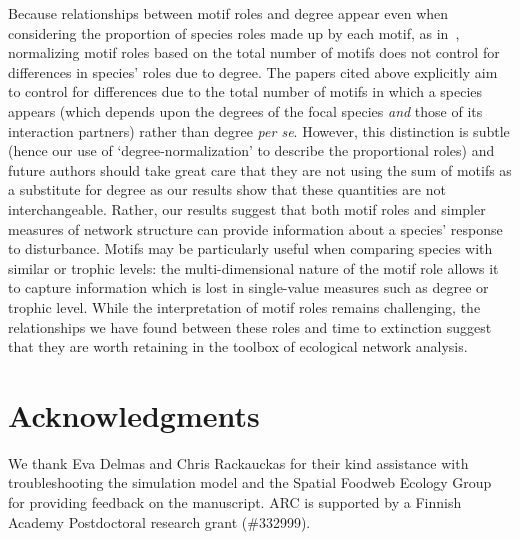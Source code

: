 \documentclass[12pt]{article}
\begin{document}
        
	    Because relationships between motif roles and degree appear even when considering the proportion of species roles made up by each motif, as in~\citet{Baker2015,Cirtwill2015,Simmons2019}, normalizing motif roles based on the total number of motifs does not control for differences in species' roles due to degree.
	    The papers cited above explicitly aim to control for differences due to the total number of motifs in which a species appears (which depends upon the degrees of the focal species \emph{and} those of its interaction partners) rather than degree \emph{per se}.
	    However, this distinction is subtle (hence our use of `degree-normalization' to describe the proportional roles) and future authors should take great care that they are not using the sum of motifs as a substitute for degree as our results show that these quantities are not interchangeable.
        Rather, our results suggest that both motif roles and simpler measures of network structure can provide information about a species' response to disturbance.
        Motifs may be particularly useful when comparing species with similar  or trophic levels: the multi-dimensional nature of the motif role allows it to capture information which is lost in single-value measures such as degree or trophic level.
        While the interpretation of motif roles remains challenging, the relationships we have found between these roles and time to extinction suggest that they are worth retaining in the toolbox of ecological network analysis.
        

\section*{Acknowledgments}

	We thank Eva Delmas and Chris Rackauckas for their kind assistance with troubleshooting the simulation model and the Spatial Foodweb Ecology Group for providing feedback on the manuscript. ARC is supported by a Finnish Academy Postdoctoral research grant (\#332999). 


\clearpage
     

\clearpage
\end{document}
